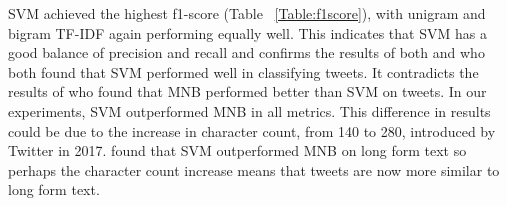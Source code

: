 SVM achieved the highest f1-score (Table ~\ref{Table:f1score}), with unigram and bigram TF-IDF again performing equally well. This indicates that SVM has a good balance of precision and recall and confirms the results of both \cite{Raithi2018} and \cite{Rane2018} who both found that SVM performed well in classifying tweets. It contradicts the results of \cite{Berm2010} who found that MNB performed better than SVM on tweets. In our experiments, SVM outperformed MNB in all metrics. This difference in results could be due to the increase in character count, from 140 to 280, introduced by Twitter in 2017. \cite{Berm2010} found that SVM outperformed MNB on long form text so perhaps the character count increase means that tweets are now more similar to long form text.

\begin{table}[h!]
\setlength{\tabcolsep}{3pt}
\caption{Accuracy of Classifiers and Feature Representations.}
\label{Table:accuracy}
\end{table}
